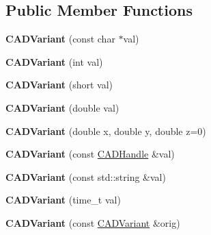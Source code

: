 \subsection*{Public Member Functions}
\begin{DoxyCompactItemize}
\item 
{\bfseries C\+A\+D\+Variant} (const char $\ast$val)\hypertarget{class_c_a_d_variant_a68ce24d11069e687fddbb2367e5a071a}{}\label{class_c_a_d_variant_a68ce24d11069e687fddbb2367e5a071a}

\item 
{\bfseries C\+A\+D\+Variant} (int val)\hypertarget{class_c_a_d_variant_ad3f6fdeb0ff96df77a4a40a539680504}{}\label{class_c_a_d_variant_ad3f6fdeb0ff96df77a4a40a539680504}

\item 
{\bfseries C\+A\+D\+Variant} (short val)\hypertarget{class_c_a_d_variant_a48705f35cd660d75385a5d5b8a6affe3}{}\label{class_c_a_d_variant_a48705f35cd660d75385a5d5b8a6affe3}

\item 
{\bfseries C\+A\+D\+Variant} (double val)\hypertarget{class_c_a_d_variant_a23b521277df3c62d867f28ab0285e5db}{}\label{class_c_a_d_variant_a23b521277df3c62d867f28ab0285e5db}

\item 
{\bfseries C\+A\+D\+Variant} (double x, double y, double z=0)\hypertarget{class_c_a_d_variant_a46f4d49111213f913e384175bcd39841}{}\label{class_c_a_d_variant_a46f4d49111213f913e384175bcd39841}

\item 
{\bfseries C\+A\+D\+Variant} (const \hyperlink{class_c_a_d_handle}{C\+A\+D\+Handle} \&val)\hypertarget{class_c_a_d_variant_a09d2bfde4868907c2a945bb4f0848d7b}{}\label{class_c_a_d_variant_a09d2bfde4868907c2a945bb4f0848d7b}

\item 
{\bfseries C\+A\+D\+Variant} (const std\+::string \&val)\hypertarget{class_c_a_d_variant_a809d13c722cc0b252d47f0b72c33e19a}{}\label{class_c_a_d_variant_a809d13c722cc0b252d47f0b72c33e19a}

\item 
{\bfseries C\+A\+D\+Variant} (time\+\_\+t val)\hypertarget{class_c_a_d_variant_a43cc75aec23c681cedbd06b4ef2d9296}{}\label{class_c_a_d_variant_a43cc75aec23c681cedbd06b4ef2d9296}

\item 
{\bfseries C\+A\+D\+Variant} (const \hyperlink{class_c_a_d_variant}{C\+A\+D\+Variant} \&orig)\hypertarget{class_c_a_d_variant_a5a6a5b5babb63b0a834ff2015bfaf647}{}\label{class_c_a_d_variant_a5a6a5b5babb63b0a834ff2015bfaf647}


\end{DoxyCompactItemize}

